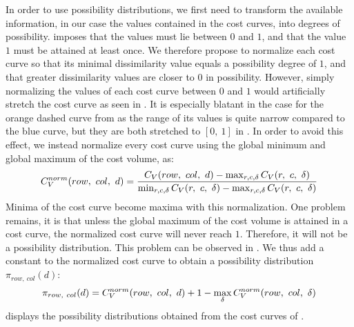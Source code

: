 In order to use possibility distributions, we first need to transform the available information, in our case the values contained in the cost curves, into degrees of possibility.  imposes that the values must lie between $0$ and $1$, and that the value $1$ must be attained at least once. We therefore propose to normalize each cost curve so that its minimal dissimilarity value equals a possibility degree of $1$, and that greater dissimilarity values are closer to $0$ in possibility. However, simply normalizing the values of each cost curve between $0$ and $1$ would artificially stretch the cost curve as seen in . It is especially blatant in the case for the orange dashed curve from  as the range of its values is quite narrow compared to the blue curve, but they are both stretched to $[0,~1]$ in . In order to avoid this effect, we instead normalize every cost curve using the global minimum and global maximum of the cost volume, as:
\begin{align}
	C_V^{norm}(row, ~col, ~d) = \dfrac{C_V(row, ~col, ~d) - \max_{r,c,\delta}C_V(r,~c,~\delta)}{\min_{r,c,\delta}C_V(r,~c,~\delta) - \max_{r,c,\delta}C_V(r,~c,~\delta)}\label{eq:normalized_cost_curve}
\end{align}
Minima of the cost curve become maxima with this normalization. One problem remains, it is that unless the global maximum of the cost volume is attained in a cost curve, the normalized cost curve will never reach $1$. Therefore, it will not be a possibility distribution. This problem can be observed in . We thus add a constant to the normalized cost curve to obtain a possibility distribution $\pi_{row,~col}(d)$:
\begin{align}
	\pi_{row,~col}(d) = C_V^{norm}(row, ~col, ~d) + 1 - \max_\delta C_V^{norm}(row, ~col, ~\delta)\label{eq:possibility_cost_curve}
\end{align}
 displays the possibility distributions obtained from the cost curves of .

